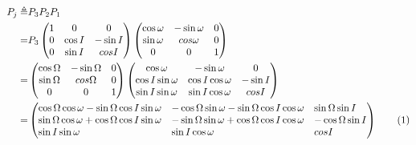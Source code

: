 \documentclass[]{article}
\newcommand\numberthis{\addtocounter{equation}{1}\tag{\theequation}}
\begin{document}
\begin{align*}
P_j \triangleq& P_3 P_2 P_1\\
 =& P_3 \begin{pmatrix}
1 & 0 & 0\\
0 & \cos I & - \sin I\\
0 & \sin I & cos I
\end{pmatrix}
\begin{pmatrix}
\cos \omega & - \sin \omega & 0\\
\sin \omega & cos \omega & 0\\
0 & 0  & 1
\end{pmatrix} \\
=& \begin{pmatrix}
\cos \Omega & - \sin \Omega & 0\\
\sin \Omega & cos \Omega & 0\\
0 & 0  & 1
\end{pmatrix}
\begin{pmatrix}
\cos \omega & -\sin \omega & 0\\
\cos I \sin \omega & \cos I \cos \omega & - \sin I\\
\sin I \sin \omega & \sin I \cos \omega & cos I
\end{pmatrix}\\
=&\begin{pmatrix*}[l]
\cos \Omega \cos \omega - \sin \Omega \cos I \sin \omega&-\cos \Omega \sin \omega - \sin \Omega \cos I \cos \omega& \sin \Omega \sin I\\
\sin \Omega \cos \omega + \cos \Omega \cos I \sin \omega& - \sin \Omega \sin \omega + \cos \Omega \cos I \cos \omega& - \cos \Omega \sin I \\
\sin I \sin \omega & \sin I \cos \omega & cos I
\end{pmatrix*}\numberthis \label{eq:Pj}
\end{align*}
\end{document}
